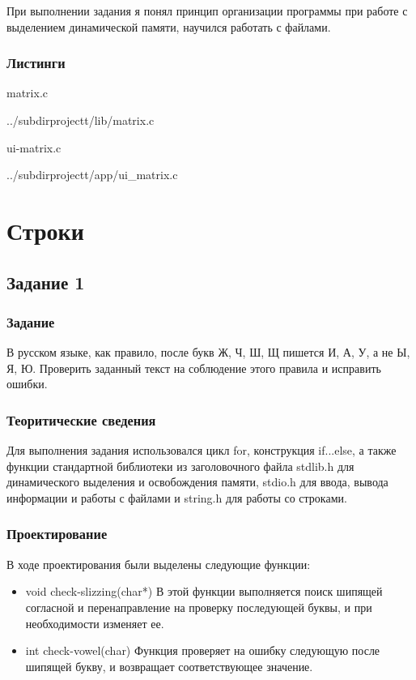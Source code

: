 \documentclass[12pt,a4paper]{report}
\begin{document}
При выполнении задания я понял принцип организации программы при работе с выделением динамической памяти, научился работать с файлами.

\subsection*{Листинги}

matrix.c

{../subdirprojectt/lib/matrix.c}

\vspace{\baselineskip}

ui-matrix.c

{../subdirprojectt/app/ui_matrix.c}

\chapter{Строки}
\section{Задание 1}
\subsection{Задание}

В русском языке, как правило, после букв Ж, Ч, Ш, Щ пишется И, А, У, а не Ы, Я, Ю. Проверить заданный текст на соблюдение этого правила и исправить ошибки.


\subsection{Теоритические сведения}

Для выполнения задания использовался цикл for, конструкция if...else, а также функции стандартной библиотеки из заголовочного файла stdlib.h для динамического выделения и освобождения памяти, stdio.h для ввода, вывода информации и работы с файлами и string.h для работы со строками. 

\subsection{Проектирование}

В ходе проектирования были выделены следующие функции:
\begin{itemize}
	 \item void check-slizzing(char*)
 	В этой функции выполняется поиск шипящей согласной и перенаправление на проверку последующей буквы, и при необходимости изменяет ее.
 	
 	\item int check-vowel(char)
 	Функция проверяет на ошибку следующую после шипящей букву, и возвращает соответствующее значение.
\end{itemize}
	
\end{document}
